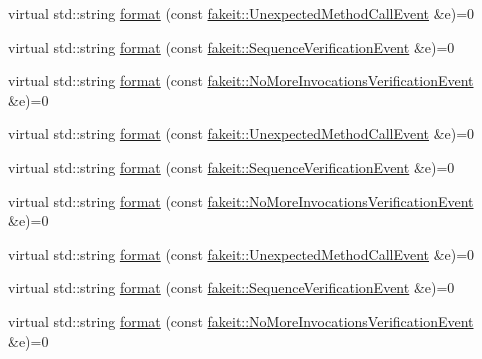 \begin{DoxyCompactItemize}
virtual std\+::string \mbox{\hyperlink{structfakeit_1_1EventFormatter_a103815eedb0a69ce7e3565270686bf7b}{format}} (const \mbox{\hyperlink{structfakeit_1_1UnexpectedMethodCallEvent}{fakeit\+::\+Unexpected\+Method\+Call\+Event}} \&e)=0
\item 
virtual std\+::string \mbox{\hyperlink{structfakeit_1_1EventFormatter_a9776a0cb30ddb959b49e1a95ef560946}{format}} (const \mbox{\hyperlink{structfakeit_1_1SequenceVerificationEvent}{fakeit\+::\+Sequence\+Verification\+Event}} \&e)=0
\item 
virtual std\+::string \mbox{\hyperlink{structfakeit_1_1EventFormatter_a2c620c0b788a1c14e8f5ac40dd57d7ad}{format}} (const \mbox{\hyperlink{structfakeit_1_1NoMoreInvocationsVerificationEvent}{fakeit\+::\+No\+More\+Invocations\+Verification\+Event}} \&e)=0
\item 
virtual std\+::string \mbox{\hyperlink{structfakeit_1_1EventFormatter_a103815eedb0a69ce7e3565270686bf7b}{format}} (const \mbox{\hyperlink{structfakeit_1_1UnexpectedMethodCallEvent}{fakeit\+::\+Unexpected\+Method\+Call\+Event}} \&e)=0
\item 
virtual std\+::string \mbox{\hyperlink{structfakeit_1_1EventFormatter_a9776a0cb30ddb959b49e1a95ef560946}{format}} (const \mbox{\hyperlink{structfakeit_1_1SequenceVerificationEvent}{fakeit\+::\+Sequence\+Verification\+Event}} \&e)=0
\item 
virtual std\+::string \mbox{\hyperlink{structfakeit_1_1EventFormatter_a2c620c0b788a1c14e8f5ac40dd57d7ad}{format}} (const \mbox{\hyperlink{structfakeit_1_1NoMoreInvocationsVerificationEvent}{fakeit\+::\+No\+More\+Invocations\+Verification\+Event}} \&e)=0
\item 
virtual std\+::string \mbox{\hyperlink{structfakeit_1_1EventFormatter_a103815eedb0a69ce7e3565270686bf7b}{format}} (const \mbox{\hyperlink{structfakeit_1_1UnexpectedMethodCallEvent}{fakeit\+::\+Unexpected\+Method\+Call\+Event}} \&e)=0
\item 
virtual std\+::string \mbox{\hyperlink{structfakeit_1_1EventFormatter_a9776a0cb30ddb959b49e1a95ef560946}{format}} (const \mbox{\hyperlink{structfakeit_1_1SequenceVerificationEvent}{fakeit\+::\+Sequence\+Verification\+Event}} \&e)=0
\item 
virtual std\+::string \mbox{\hyperlink{structfakeit_1_1EventFormatter_a2c620c0b788a1c14e8f5ac40dd57d7ad}{format}} (const \mbox{\hyperlink{structfakeit_1_1NoMoreInvocationsVerificationEvent}{fakeit\+::\+No\+More\+Invocations\+Verification\+Event}} \&e)=0
\end{DoxyCompactItemize}


